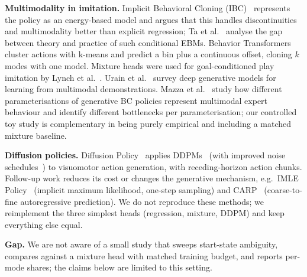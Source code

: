 \textbf{Multimodality in imitation.} Implicit Behavioral Cloning (IBC)~\cite{florence2021implicit} represents the policy as an energy-based model and argues that this handles discontinuities and multimodality better than explicit regression; Ta et al.~\cite{ta2022conditional} analyse the gap between theory and practice of such conditional EBMs. Behavior Transformers~\cite{shafiullah2022behavior} cluster actions with k-means and predict a bin plus a continuous offset, cloning $k$ modes with one model. Mixture heads were used for goal-conditioned play imitation by Lynch et al.~\cite{lynch2019learning}. Urain et al.~\cite{urain2024deep} survey deep generative models for learning from multimodal demonstrations. Mazza et al.~\cite{mazza2026understanding} study how different parameterisations of generative BC policies represent multimodal expert behaviour and identify different bottlenecks per parameterisation; our controlled toy study is complementary in being purely empirical and including a matched mixture baseline.

\textbf{Diffusion policies.} Diffusion Policy~\cite{chi2023diffusion} applies DDPMs~\cite{ho2020denoising} (with improved noise schedules~\cite{nichol2021improved}) to visuomotor action generation, with receding-horizon action chunks. Follow-up work reduces its cost or changes the generative mechanism, e.g.\ IMLE Policy~\cite{rana2025imle} (implicit maximum likelihood, one-step sampling) and CARP~\cite{gong2024carp} (coarse-to-fine autoregressive prediction). We do not reproduce these methods; we reimplement the three simplest heads (regression, mixture, DDPM) and keep everything else equal.

\textbf{Gap.} We are not aware of a small study that sweeps start-state ambiguity, compares against a mixture head with matched training budget, and reports per-mode shares; the claims below are limited to this setting.

